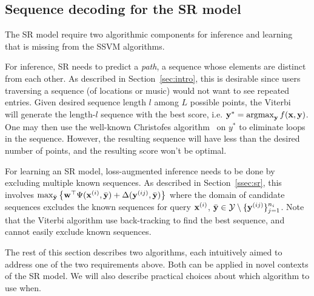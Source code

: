 
\subsection{Sequence decoding for the SR model}
\label{ssec:subtour}

The SR model require two algorithmic components for inference and learning that is missing from the SSVM algorithms. 

For inference, SR needs to predict a {\em path}, \ie a sequence whose elements are distinct from each other. 
As described in Section~\ref{sec:intro}, this is desirable since users traversing a sequence (of locations or music)
would not want to see repeated entries. 
Given desired sequence length $l$ among $L$ possible points, the Viterbi~\cite{tsochantaridis2005large} 
will generate the length-$l$ sequence with the best score, i.e. $\mathbf{y}^* = \operatorname*{argmax}_{\mathbf{y}} f(\mathbf{x},\mathbf{y})$. 
One may then use the well-known 
Christofes algorithm~\cite{christofides1976} on $y^*$ to eliminate loops in the sequence. 
However, the resulting sequence will have less than the desired number of points, and the resulting score won't be optimal. 

For learning an SR model, loss-augmented inference needs to be done by excluding multiple known sequences. 
As described in Section~\ref{ssec:sr}, this involves %
$\max_{\bar{\mathbf{y}}} \left\{ \mathbf{w}^\top \Psi(\mathbf{x}^{(i)}, \bar{\mathbf{y}}) + \Delta(\mathbf{y}^{(ij)}, \bar{\mathbf{y}}) \right\}$
where the domain of candidate sequences excludes the known sequences for query $\mathbf{x}^{(i)}$, \ie $\bar{\mathbf{y}} \in \mathcal{Y} \setminus \{\mathbf{y}^{(ij)}\}_{j=1}^{n_i}$. 
Note that the Viterbi algorithm use back-tracking to find the best sequence, 
and cannot easily exclude known sequences. 


The rest of this section describes two algorithms, each intuitively aimed to address one of the two requirements above. 
Both can be applied in novel contexts of the SR model. 
We will also describe practical choices about which algorithm to use when. 


